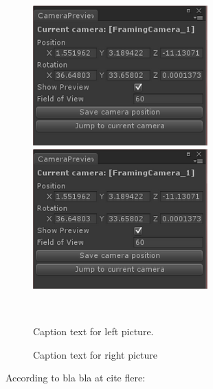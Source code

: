 \begin{figure}[htbp] \centering
\begin{minipage}[b]{0.45\textwidth} \centering
\includegraphics[width=0.60\textwidth]{Pics/Dummy} %
\end{minipage} \hfill
\begin{minipage}[b]{0.45\textwidth} \centering
\includegraphics[width=0.60\textwidth]{Pics/Dummy} %
\end{minipage} \\ %
\begin{minipage}[t]{0.45\textwidth}
\caption{Caption text for left picture.} %
\label{fig:cap1}
\end{minipage} \hfill
\begin{minipage}[t]{0.45\textwidth}
\caption{Caption text for right picture} %
\label{fig:cap2}
\end{minipage}
\end{figure}

According to bla bla \cite{haigh-hutchinson_real-time_2009} %
at cite flere: \cite{haigh-hutchinson_real-time_2009, haigh-hutchinson_real-time_2009, haigh-hutchinson_real-time_2009}


